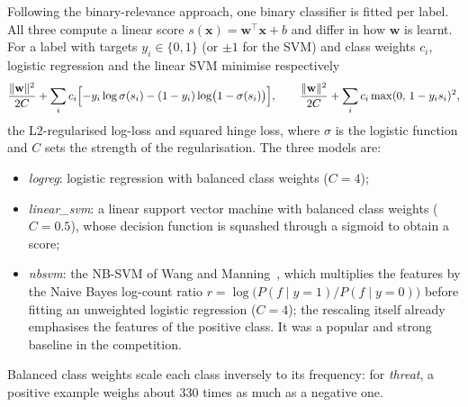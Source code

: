 \documentclass[11pt,a4paper]{article}
\begin{document}
Following the binary-relevance approach, one binary classifier is fitted per
label.  All three compute a linear score $s(\mathbf{x}) = \mathbf{w}^\top
\mathbf{x} + b$ and differ in how $\mathbf{w}$ is learnt.  For a label with
targets $y_i \in \{0,1\}$ (or $\pm1$ for the SVM) and class weights $c_i$,
logistic regression and the linear SVM minimise respectively
\begin{equation}
  \frac{\lVert \mathbf{w} \rVert^2}{2C}
  + \sum_i c_i \Bigl[ -y_i \log \sigma(s_i) - (1-y_i)\log\bigl(1-\sigma(s_i)\bigr) \Bigr],
  \qquad
  \frac{\lVert \mathbf{w} \rVert^2}{2C} + \sum_i c_i \max(0,\, 1 - y_i s_i)^2,
\end{equation}
the L2-regularised log-loss and squared hinge loss, where $\sigma$ is the
logistic function and $C$ sets the strength of the regularisation.  The three
models are:
\begin{itemize}
  \item \emph{logreg}: logistic regression with balanced class weights
        ($C = 4$);
  \item \emph{linear\_svm}: a linear support vector machine with balanced
        class weights ($C = 0.5$), whose decision function is squashed through
        a sigmoid to obtain a score;
  \item \emph{nbsvm}: the NB-SVM of Wang and Manning~\cite{wang2012}, which
        multiplies the features by the Naive Bayes log-count ratio
        $r = \log\big(P(f \mid y{=}1) / P(f \mid y{=}0)\big)$ before fitting an
        unweighted logistic regression ($C = 4$); the rescaling itself already
        emphasises the features of the positive class.  It was a popular and
        strong baseline in the competition.
\end{itemize}
Balanced class weights scale each class inversely to its frequency: for
\emph{threat}, a positive example weighs about 330 times as much as a negative
one.
\end{document}
